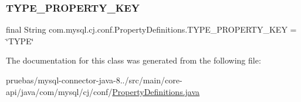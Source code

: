 \subsubsection{\texorpdfstring{T\+Y\+P\+E\+\_\+\+P\+R\+O\+P\+E\+R\+T\+Y\+\_\+\+K\+EY}{TYPE\_PROPERTY\_KEY}}
{\footnotesize\ttfamily final String com.\+mysql.\+cj.\+conf.\+Property\+Definitions.\+T\+Y\+P\+E\+\_\+\+P\+R\+O\+P\+E\+R\+T\+Y\+\_\+\+K\+EY = \char`\"{}T\+Y\+PE\char`\"{}\hspace{0.3cm}{\ttfamily [static]}}



The documentation for this class was generated from the following file\+:\begin{DoxyCompactItemize}
\item 
pruebas/mysql-\/connector-\/java-\/8../src/main/core-\/api/java/com/mysql/cj/conf/\mbox{\hyperlink{_property_definitions_8java}{Property\+Definitions.\+java}}\end{DoxyCompactItemize}
